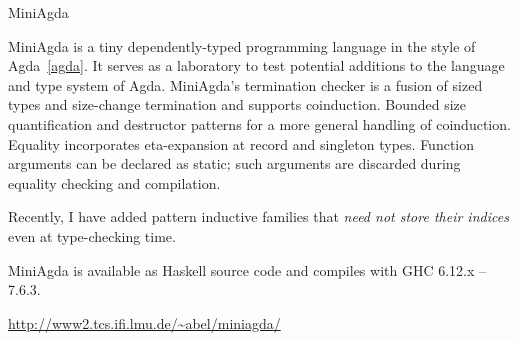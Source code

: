 \begin{hcarentry}{MiniAgda}
\makeheader

MiniAgda is a tiny dependently-typed programming language in the style
of Agda~\cref{agda}. It serves as a laboratory to test 
potential additions to the
language and type system of Agda. MiniAgda's termination checker is a
fusion of sized types and size-change termination and supports
coinduction. Bounded size quantification and destructor
patterns for a more general handling of coinduction.
Equality incorporates eta-expansion at record and
singleton types. Function arguments can be declared as static; such
arguments are discarded during equality checking and compilation.

Recently, I have added pattern inductive families that \emph{need not store
their indices} even at type-checking time.
 
MiniAgda is available as Haskell source code and compiles with GHC
6.12.x -- 7.6.3. 

\FurtherReading
  \url{http://www2.tcs.ifi.lmu.de/~abel/miniagda/}
\end{hcarentry}

